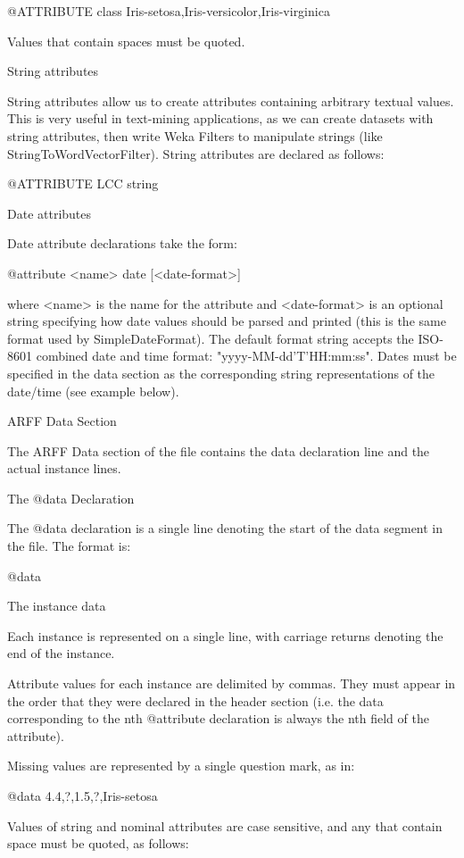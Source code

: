     @ATTRIBUTE class        {Iris-setosa,Iris-versicolor,Iris-virginica}
   
Values that contain spaces must be quoted.

String attributes

String attributes allow us to create attributes containing arbitrary textual values. This is very useful in text-mining applications, as we can create datasets with string attributes, then write Weka Filters to manipulate strings (like StringToWordVectorFilter). String attributes are declared as follows:

    @ATTRIBUTE LCC    string
   
Date attributes

Date attribute declarations take the form:

    @attribute <name> date [<date-format>]
   
where <name> is the name for the attribute and <date-format> is an optional string specifying how date values should be parsed and printed (this is the same format used by SimpleDateFormat). The default format string accepts the ISO-8601 combined date and time format: "yyyy-MM-dd'T'HH:mm:ss".
Dates must be specified in the data section as the corresponding string representations of the date/time (see example below).

ARFF Data Section

The ARFF Data section of the file contains the data declaration line and the actual instance lines.

The @data Declaration

The @data declaration is a single line denoting the start of the data segment in the file. The format is:

    @data
   
The instance data

Each instance is represented on a single line, with carriage returns denoting the end of the instance.

Attribute values for each instance are delimited by commas. They must appear in the order that they were declared in the header section (i.e. the data corresponding to the nth @attribute declaration is always the nth field of the attribute).

Missing values are represented by a single question mark, as in:

    @data
    4.4,?,1.5,?,Iris-setosa
   
Values of string and nominal attributes are case sensitive, and any that contain space must be quoted, as follows:

